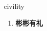 
\begin{frame}
{\huge civility}
\begin{center}
\begin{enumerate}\Large
  \item \textbf{彬彬有礼}
\end{enumerate}
\end{center}
\end{frame}
